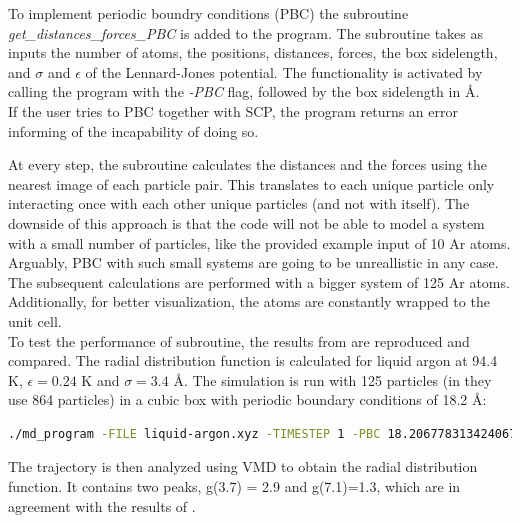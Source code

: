 \documentclass{cis320}
\begin{document}
To implement periodic boundry conditions (PBC) the subroutine \textit{get\_distances\_forces\_PBC} is added to the program. The subroutine takes as inputs the number of atoms, the positions, distances, forces, the box sidelength, and $\sigma$ and $\epsilon$ of the Lennard-Jones potential. The functionality is activated by calling the program with the \textit{-PBC} flag, followed by the box sidelength in \r{A}. \\
If the user tries to PBC together with SCP, the program returns an error informing of the incapability of doing so.\\
\par
At every step, the subroutine calculates the distances and the forces using the nearest image of each particle pair. This translates to each unique particle only interacting once with each other unique particles (and not with itself). The downside of this approach is that the code will not be able to model a system with a small number of particles, like the provided example input of 10 Ar atoms. Arguably, PBC with such small systems are going to be unreallistic in any case. The subsequent calculations are performed with a bigger system of 125 Ar atoms.\\
Additionally, for better visualization, the atoms are constantly wrapped to the unit cell.\\

To test the performance of subroutine, the results from \cite{rahman1964correlations} are reproduced and compared. The radial distribution function is calculated for liquid argon at 94.4 K, $\epsilon=0.24$ K and $\sigma=3.4$ Å. The simulation is run with 125 particles (in \cite{rahman1964correlations} they use 864 particles) in a cubic box with periodic boundary conditions of 18.2 Å:

\begin{lstlisting}[language=bash]
    ./md_program -FILE liquid-argon.xyz -TIMESTEP 1 -PBC 18.206778313424067 -SAVEFREQ 100 -MAX_MD_STEPS 10000 -THERMO BEREN 10 -TEMP 94.4 -EPS 0.23846451108000002 -SIGMA 3.4 \end{lstlisting}

The trajectory is then analyzed using VMD to obtain the radial distribution function. It contains two peaks, g(3.7) = 2.9 and g(7.1)=1.3, which are in agreement with the results of \cite{rahman1964correlations}.
\end{document}
